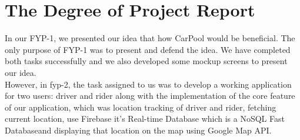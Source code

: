 \section{The Degree of Project Report}
In our FYP-1, we presented our idea that how CarPool would be beneficial. The only purpose of FYP-1 was to present and defend the idea. We have completed both tasks successfully and we also developed some mockup screens to present our idea.
\\ However, in fyp-2, the task assigned to us was to develop a working application for two users: driver and rider along with the implementation of the core feature of our application, which was location tracking of driver and rider, fetching current location, use Firebase it’s Real-time Database which is a NoSQL Fast Databaseand displaying that location on the map using Google Map API.
